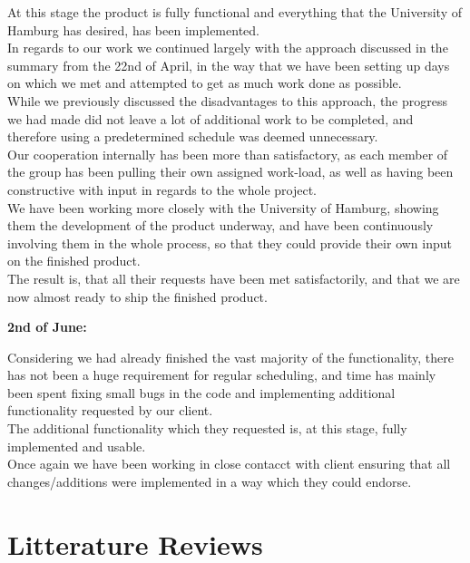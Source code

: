 \documentclass[12pt,a4paper]{article}
\begin{document}
At this stage the product is fully functional and everything that the University of Hamburg has desired, has been implemented.\\
In regards to our work we continued largely with the approach discussed in the summary from the 22nd of April, in the way that we have been setting up days on which we met and attempted to get as much work done as possible.\\
While we previously discussed the disadvantages to this approach, the progress we had made did not leave a lot of additional work to be completed, and therefore using a predetermined schedule was deemed unnecessary.\\
Our cooperation internally has been more than satisfactory, as each member of the group has been pulling their own assigned work-load, as well as having been constructive with input in regards to the whole project.\\
We have been working more closely with the University of Hamburg, showing them the development of the product underway, and have been continuously involving them in the whole process, so that they could provide their own input on the finished product.\\
The result is, that all their requests have been met satisfactorily, and that we are now almost ready to ship the finished product.

{\bf 2nd of June:}

Considering we had already finished the vast majority of the functionality, there has not been a huge requirement for regular scheduling, and time has mainly been spent fixing small bugs in the code and implementing additional functionality requested by our client.\\
The additional functionality which they requested is, at this stage, fully implemented and usable.\\
Once again we have been working in close contacct with client ensuring that all changes/additions were implemented in a way which they could endorse.

\newpage
\section{Litterature Reviews}
\end{document}
